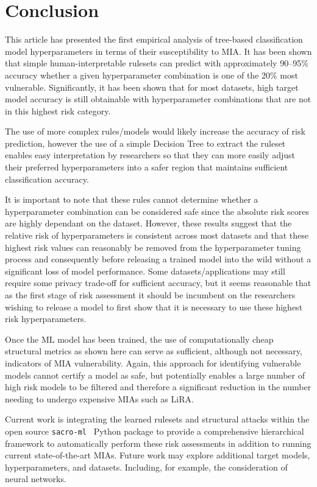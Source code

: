 \section{Conclusion}%
\label{sec:conclusion}

This article has presented the first empirical analysis of tree-based classification model hyperparameters in terms of their susceptibility to MIA\@. It has been shown that simple human-interpretable rulesets can predict with approximately 90--95\% accuracy whether a given hyperparameter combination is one of the 20\% most vulnerable. Significantly, it has been shown that for most datasets, high target model accuracy is still obtainable with hyperparameter combinations that are not in this highest risk category.

The use of more complex rules/models would likely increase the accuracy of risk prediction, however the use of a simple Decision Tree to extract the ruleset enables easy interpretation by researchers so that they can more easily adjust their preferred hyperparameters into a safer region that maintains sufficient classification accuracy.

It is important to note that these rules cannot determine whether a hyperparameter combination can be considered safe since the absolute risk scores are highly dependant on the dataset. However, these results suggest that the relative risk of hyperparameters is consistent across most datasets and that these highest risk values can reasonably be removed from the hyperparameter tuning process and consequently before releasing a trained model into the wild without a significant loss of model performance. Some datasets/applications may still require some privacy trade-off for sufficient accuracy, but it seems reasonable that as the first stage of risk assessment it should be incumbent on the researchers wishing to release a model to first show that it is necessary to use these highest risk hyperparameters.

Once the ML model has been trained, the use of computationally cheap structural metrics as shown here can serve as sufficient, although not necessary, indicators of MIA vulnerability. Again, this approach for identifying vulnerable models cannot certify a model as safe, but potentially enables a large number of high risk models to be filtered and therefore a significant reduction in the number needing to undergo expensive MIAs such as LiRA\@.

Current work is integrating the learned rulesets and structural attacks within the open source \texttt{sacro-ml}~\cite{Smith:2024} Python package to provide a comprehensive hierarchical framework to automatically perform these risk assessments in addition to running current state-of-the-art MIAs. Future work may explore additional target models, hyperparameters, and datasets. Including, for example, the consideration of neural networks.
